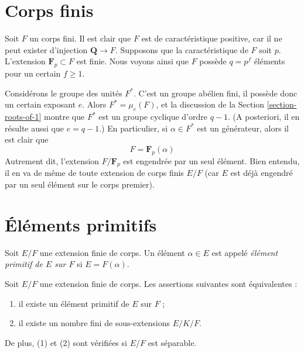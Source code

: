 \section{Corps finis}
\label{section-finite}

\noindent
Soit $F$ un corps fini. Il est clair que $F$ est de caractéristique positive,
car il ne peut exister d'injection $\mathbf{Q} \to F$. Supposons que la caractéristique
de $F$ soit $p$. L'extension $\mathbf{F}_p \subset F$ est finie.
Nous voyons ainsi que $F$ possède $q = p^f$ éléments pour un certain $f \geq 1$.

\medskip\noindent
Considérons le groupe des unités $F^*$. C'est un groupe abélien
fini, il possède donc un certain exposant $e$. Alors $F^* = \mu_e(F)$, et la
discussion de la Section \ref{section-roots-of-1} montre que $F^*$
est un groupe cyclique d'ordre $q - 1$. (A posteriori, il en résulte aussi que
$e = q - 1$.) En particulier, si $\alpha \in F^*$ est un générateur,
alors il est clair que
$$
F = \mathbf{F}_p(\alpha)
$$
Autrement dit, l'extension $F/\mathbf{F}_p$ est engendrée par un seul
élément. Bien entendu, il en va de même de toute extension de corps finis
$E/F$ (car $E$ est déjà engendré par un seul élément sur
le corps premier).





\section{Éléments primitifs}
\label{section-primitive-element}

\noindent
Soit $E/F$ une extension finie de corps. Un élément $\alpha \in E$
est appelé {\it élément primitif de $E$ sur $F$} si $E = F(\alpha)$.

\begin{lemma}
\label{lemma-primitive-element}
Soit $E/F$ une extension finie de corps. Les assertions suivantes sont équivalentes :
\begin{enumerate}
\item il existe un élément primitif de $E$ sur $F$ ;
\item il existe un nombre fini de sous-extensions $E/K/F$.
\end{enumerate}
De plus, (1) et (2) sont vérifiées si $E/F$ est séparable.
\end{lemma}

